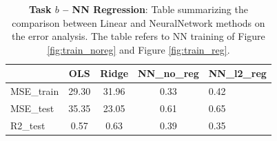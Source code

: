 \documentclass[english,notitlepage,reprint,nofootinbib]{revtex4-1}  %
\begin{document}
\begin{table}[H]
\centering 
\begin{tabular}{@{}ccccc@{}}
& OLS   & Ridge & NN\_no\_reg & NN\_l2\_reg \\ [0.5ex] 
\hline\hline
\multicolumn{1}{|l|}{MSE\_train} & 29.30 & 31.96 & 0.33        & \multicolumn{1}{l|}{0.42} \\ \midrule
\multicolumn{1}{|l|}{MSE\_test}  & 35.35 & 23.05 & 0.61        & \multicolumn{1}{l|}{0.65} \\ \midrule
\multicolumn{1}{|l|}{R2\_test}   & 0.57  & 0.63  & 0.39        & \multicolumn{1}{l|}{0.35} \\ \hline \bottomrule
\end{tabular}
\label{tab:nn_lin}
\caption{\textbf{Task $b$ – NN Regression}: Table summarizing the comparison between Linear and NeuralNetwork methods on the error analysis. The table refers to NN training of Figure \ref{fig:train_noreg} and Figure \ref{fig:train_reg}.}
\label{tab:nn_lin}
\end{table}
\end{document}
